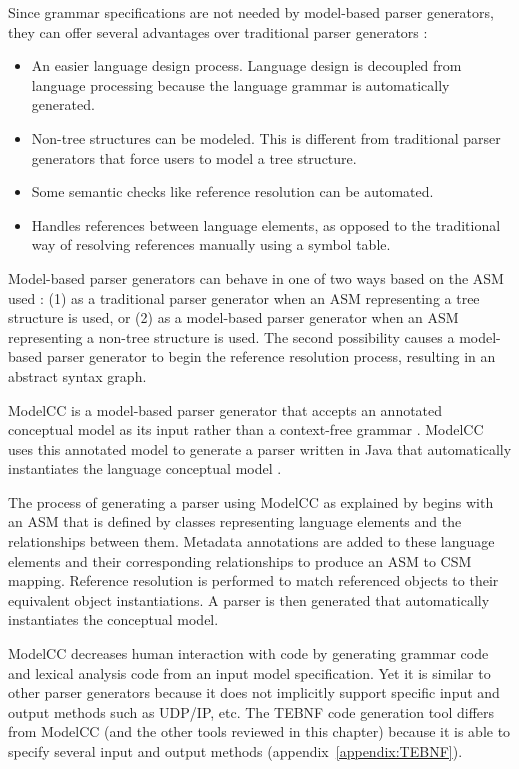 \indent
Since grammar specifications are not needed by model-based parser generators, they can offer several advantages over traditional parser generators \cite{quesada_02}:
\begin{itemize}
  \item An easier language design process.  Language design is decoupled from language processing because the language grammar is automatically generated.
  \item Non-tree structures can be modeled.  This is different from traditional parser generators that force users to model a tree structure.
  \item Some semantic checks like reference resolution can be automated.
  \item Handles references between language elements, as opposed to the traditional way of resolving references manually using a symbol table.
\end{itemize}

\indent
Model-based parser generators can behave in one of two ways based on the ASM used \cite{quesada_02}: (1) as a traditional parser generator when an ASM representing a tree structure is used, or (2) as a model-based parser generator when an ASM representing a non-tree structure is used.   The second possibility causes a model-based parser generator to begin the reference resolution process, resulting in an abstract syntax graph.

\indent
ModelCC is a model-based parser generator that accepts an annotated conceptual model as its input rather than a context-free grammar \cite{quesada_01}.  ModelCC uses this annotated model to generate a parser written in Java that automatically instantiates the language conceptual model \cite{quesada_01, modelcc_01}.

\indent
The process of generating a parser using ModelCC as explained by \cite{quesada_02} begins with an ASM that is defined by classes representing language elements and the relationships between them.  Metadata annotations are added to these language elements and their corresponding relationships to produce an ASM to CSM mapping.  Reference resolution is performed to match referenced objects to their equivalent object instantiations.  A parser is then generated that automatically instantiates the conceptual model.

\indent
ModelCC decreases human interaction with code by generating grammar code and lexical analysis code from an input model specification.  Yet it is similar to other parser generators because it does not implicitly support specific input and output methods such as UDP/IP, etc.  The TEBNF code generation tool differs from ModelCC (and the other tools reviewed in this chapter) because it is able to specify several input and output methods (appendix~\ref{appendix:TEBNF}).

